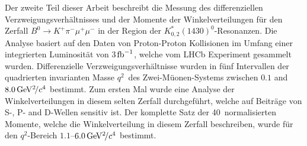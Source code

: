 Der zweite Teil dieser Arbeit beschreibt die Messung des differenziellen
Verzweigungsverh{\"a}ltnisses und der Momente der Winkelverteilungen f{\"u}r
den Zerfall $B^{0} \to K^{+}\pi^{-}\mu^{+}\mu^{-}$ in der Region der
$K^{*}_{0,2}(1430)^{0}$-Resonanzen. Die Analyse basiert auf den Daten von
Proton-Proton Kollisionen im Umfang einer integrierten Luminosit{\"a}t von
3$\mbox{\,fb}^{-1}$, welche vom LHCb Experiment gesammelt wurden.
Differenzielle Verzweigungsverh{\"a}ltnisse wurden in f{\"u}nf Intervallen der
quadrierten invarianten Masse $q^{2}$\ des Zwei-M{\"u}onen-Systems zwischen $0.1$
and $8.0{\mathrm{\,Ge\kern -0.1em V^2\!/}c^4}$ bestimmt. Zum ersten Mal wurde
eine Analyse der Winkelverteilungen in diesem selten Zerfall durchgef{\"u}hrt,
welche auf Beitr{\"a}ge von S-, P- and D-Wellen sensitiv ist. Der komplette
Satz der 40~normalisierten Momente, welche die Winkelverteilung in diesem
Zerfall beschreiben, wurde f{\"u}r den $q^{2}$-Bereich
$1.1$--$6.0{\mathrm{\,Ge\kern -0.1em V^2\!/}c^4}$ bestimmt.